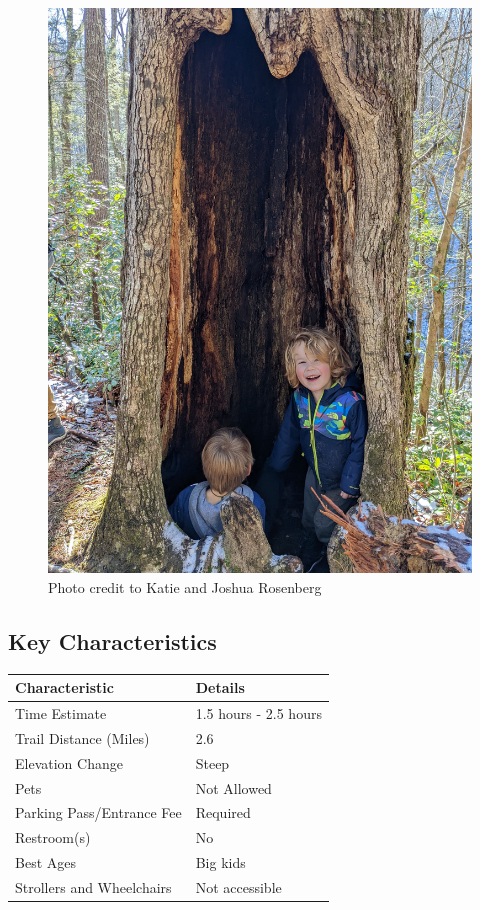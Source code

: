 \documentclass[
  letterpaper,
  DIV=11,
  numbers=noendperiod]{scrreprt}
\begin{document}
\begin{figure}[H]

{\centering \includegraphics[width=6.25in,height=\textheight,keepaspectratio]{img/trail-27-figure-01.jpg}

}

\caption{Photo credit to Katie and Joshua Rosenberg}

\end{figure}%

\subsection{Key Characteristics}\label{key-characteristics-26}

\begin{longtable}[]{@{}ll@{}}
\toprule\noalign{}
\textbf{Characteristic} & \textbf{Details} \\
\midrule\noalign{}
\endhead
\bottomrule\noalign{}
\endlastfoot
Time Estimate & 1.5 hours - 2.5 hours \\
Trail Distance (Miles) & 2.6 \\
Elevation Change & Steep \\
Pets & Not Allowed \\
Parking Pass/Entrance Fee & Required \\
Restroom(s) & No \\
Best Ages & Big kids \\
Strollers and Wheelchairs & Not accessible \\
\end{longtable}
\end{document}
